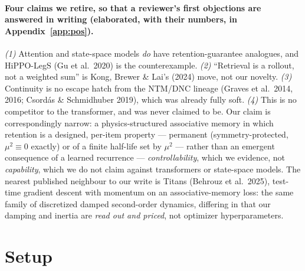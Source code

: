 \documentclass{article}
\begin{document}
{\paragraph{Four claims we retire, so that a reviewer's first objections are answered in writing (elaborated, with their numbers, in Appendix~\ref{app:pos}).} \emph{(1)} Attention and state-space models \emph{do} have retention-guarantee analogues, and HiPPO-LegS (Gu et al.\ 2020) is the counterexample. \emph{(2)} ``Retrieval is a rollout, not a weighted sum'' is Kong, Brewer \& Lai's (2024) move, not our novelty. \emph{(3)} Continuity is no escape hatch from the NTM/DNC lineage (Graves et al.\ 2014, 2016; Csord\'as \& Schmidhuber 2019), which was already fully soft. \emph{(4)} This is no competitor to the transformer, and was never claimed to be. Our claim is correspondingly narrow: a physics-structured associative memory in which retention is a designed, per-item property --- permanent (symmetry-protected, $\mu^2\equiv0$ exactly) or of a finite half-life set by $\mu^2$ --- rather than an emergent consequence of a learned recurrence --- \emph{controllability}, which we evidence, not \emph{capability}, which we do not claim against transformers or state-space models. The nearest published neighbour to our write is Titans (Behrouz et al.\ 2025), test-time gradient descent with momentum on an associative-memory loss: the same family of discretized damped second-order dynamics, differing in that our damping and inertia are \emph{read out and priced}, not optimizer hyperparameters.\par}

\section{Setup}\label{sec:setup}
\end{document}
